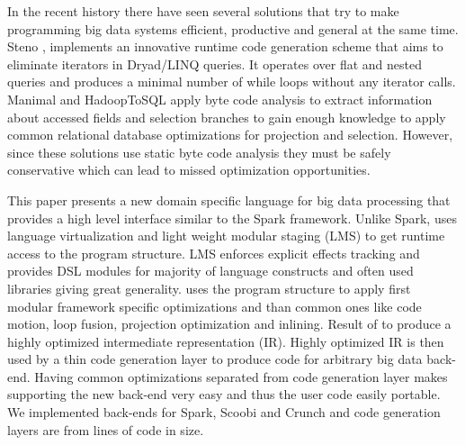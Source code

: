 In the recent history there have seen several solutions that try to make programming big data systems efficient, productive and general at the same time. Steno \cite{murray_steno:_2011}, implements an innovative runtime code generation scheme that aims to eliminate iterators in Dryad/LINQ queries. It operates over flat and nested queries and produces a minimal number of while loops without any iterator calls. Manimal \cite{jahani_automatic_2011} and HadoopToSQL \cite{iu_hadooptosql:_2010} apply byte code analysis to extract information about accessed fields and selection branches to gain enough knowledge to apply common relational database optimizations for projection and selection. However, since these solutions use static byte code analysis they must be safely conservative which can lead to missed optimization opportunities.         

This paper presents a new domain specific language \tool for big data processing that provides a high level interface similar to the Spark framework. Unlike Spark, \tool uses language virtualization \cite{moors_scala-virtualized_2012} and light weight modular staging (LMS)\cite{rompf_lightweight_2010} to get runtime access to the program structure. LMS enforces explicit effects tracking and provides DSL modules for majority of language constructs and often used libraries giving \tool great generality. \tool uses the program structure to apply first modular framework specific optimizations and than common ones like code motion, loop fusion, projection optimization and inlining. Result of to produce a highly optimized intermediate representation (IR). Highly optimized IR is then used by a thin code generation layer to produce code for arbitrary big data back-end. Having common optimizations separated from code generation layer makes supporting the new back-end very easy and thus the user code easily portable. We implemented back-ends for Spark, Scoobi \cite{nicta_scoobi_2012} and Crunch \cite{_crunch_2012} and code generation layers are from  lines of code in size. 

 

